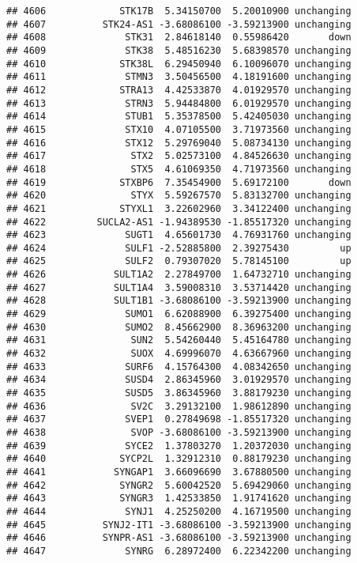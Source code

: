 \documentclass[]{article}
\begin{document}
\begin{verbatim}
## 4606             STK17B  5.34150700  5.20010900 unchanging
## 4607          STK24-AS1 -3.68086100 -3.59213900 unchanging
## 4608              STK31  2.84618140  0.55986420       down
## 4609              STK38  5.48516230  5.68398570 unchanging
## 4610             STK38L  6.29450940  6.10096070 unchanging
## 4611              STMN3  3.50456500  4.18191600 unchanging
## 4612             STRA13  4.42533870  4.01929570 unchanging
## 4613              STRN3  5.94484800  6.01929570 unchanging
## 4614              STUB1  5.35378500  5.42405030 unchanging
## 4615              STX10  4.07105500  3.71973560 unchanging
## 4616              STX12  5.29769040  5.08734130 unchanging
## 4617               STX2  5.02573100  4.84526630 unchanging
## 4618               STX5  4.61069350  4.71973560 unchanging
## 4619             STXBP6  7.35454900  5.69172100       down
## 4620               STYX  5.59267570  5.83132700 unchanging
## 4621             STYXL1  3.22602960  3.34122400 unchanging
## 4622         SUCLA2-AS1 -1.94389530 -1.85517320 unchanging
## 4623              SUGT1  4.65601730  4.76931760 unchanging
## 4624              SULF1 -2.52885800  2.39275430         up
## 4625              SULF2  0.79307020  5.78145100         up
## 4626            SULT1A2  2.27849700  1.64732710 unchanging
## 4627            SULT1A4  3.59008310  3.53714420 unchanging
## 4628            SULT1B1 -3.68086100 -3.59213900 unchanging
## 4629              SUMO1  6.62088900  6.39275400 unchanging
## 4630              SUMO2  8.45662900  8.36963200 unchanging
## 4631               SUN2  5.54260440  5.45164780 unchanging
## 4632               SUOX  4.69996070  4.63667960 unchanging
## 4633              SURF6  4.15764300  4.08342650 unchanging
## 4634              SUSD4  2.86345960  3.01929570 unchanging
## 4635              SUSD5  3.86345960  3.88179230 unchanging
## 4636               SV2C  3.29132100  1.98612890 unchanging
## 4637              SVEP1  0.27849698 -1.85517320 unchanging
## 4638               SVOP -3.68086100 -3.59213900 unchanging
## 4639              SYCE2  1.37803270  1.20372030 unchanging
## 4640             SYCP2L  1.32912310  0.88179230 unchanging
## 4641            SYNGAP1  3.66096690  3.67880500 unchanging
## 4642             SYNGR2  5.60042520  5.69429060 unchanging
## 4643             SYNGR3  1.42533850  1.91741620 unchanging
## 4644              SYNJ1  4.25250200  4.16719500 unchanging
## 4645          SYNJ2-IT1 -3.68086100 -3.59213900 unchanging
## 4646          SYNPR-AS1 -3.68086100 -3.59213900 unchanging
## 4647              SYNRG  6.28972400  6.22342200 unchanging

\end{verbatim}
\end{document}
